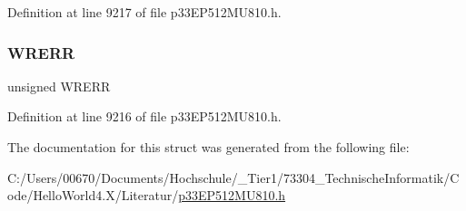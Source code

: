 Definition at line 9217 of file p33\+E\+P512\+M\+U810.\+h.

\mbox{\label{structtag_n_v_m_c_o_n_b_i_t_s_a3bb4589054cd59f1b8572d6a902d95ff}} 
\subsubsection{\texorpdfstring{W\+R\+E\+RR}{WRERR}}
{\footnotesize\ttfamily unsigned W\+R\+E\+RR}



Definition at line 9216 of file p33\+E\+P512\+M\+U810.\+h.



The documentation for this struct was generated from the following file\+:\begin{DoxyCompactItemize}
\item 
C\+:/\+Users/00670/\+Documents/\+Hochschule/\+\_\+\+Tier1/73304\+\_\+\+Technische\+Informatik/\+Code/\+Hello\+World4.\+X/\+Literatur/\hyperlink{p33_e_p512_m_u810_8h}{p33\+E\+P512\+M\+U810.\+h}\end{DoxyCompactItemize}
